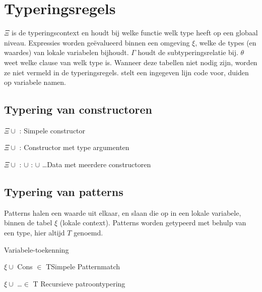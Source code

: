 \section{Typeringsregels}

$\Xi$ is de typeringscontext en houdt bij welke functie welk type heeft op een globaal niveau.
Expressies worden ge\"evalueerd binnen een omgeving $\xi$, welke de types (en waardes) van lokale variabelen bijhoudt.
$\Gamma$ houdt de subtyperingsrelatie bij. $\theta$ weet welke clause van welk
type is.
Wanneer deze tabellen niet nodig zijn, worden ze niet vermeld in de
typeringsregels.
 stelt een ingegeven lijn code voor,  duiden op variabele namen.
\newline



\subsection{Typering van constructoren}


	{$\Xi \cup $  : }{Simpele constructor}
	
	{$\Xi \cup $  : }{Constructor met type argumenten}

	{$\Xi \cup $  :  $\cup$  :  $\cup$ \ldots}{Data met meerdere constructoren}

\subsection{Typering van patterns}

Patterns halen een waarde uit elkaar, en slaan die op in een lokale variabele, binnen de tabel $\xi$ (lokale context).
Patterns worden getypeerd met behulp van een type, hier altijd $T$ genoemd.

	{Variabele-toekenning}
	
{$\xi \cup$ Cons $\in$ T}{Simpele Patternmatch}

{$\xi \cup$    \ldots $\in$ T} {Recursieve
patroontypering}

